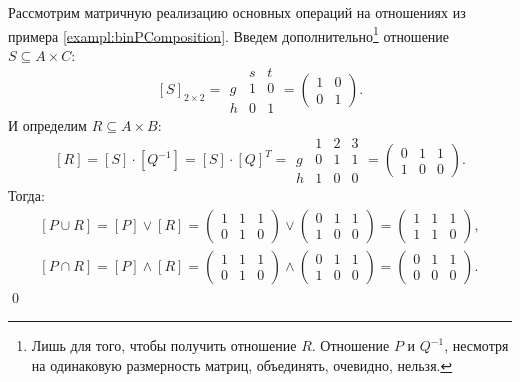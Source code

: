 \begin{exampl}
    Рассмотрим матричную реализацию основных операций на отношениях из примера \ref{exampl:binPComposition}. Введем дополнительно\footnote{Лишь для того, чтобы получить отношение $R$. Отношение $P$ и $Q^{-1}$, несмотря на одинаковую размерность матриц, объединять, очевидно, нельзя.} отношение $S\subseteq A\times C$:
    \[
        [S]_{2\times 2}=
        \begin{array}{c|cc}
              & s & t \\ \hline
            g & 1 & 0 \\
            h & 0 & 1 
        \end{array}=
        \begin{pmatrix}
            1&0\\
            0&1
        \end{pmatrix}.        
    \]
    И определим $R\subseteq A\times B$:
    \[
        [R]=[S]\cdot[Q^{-1}]=
        [S]\cdot[Q]^T=
        \begin{array}{c|ccc}
              & 1 & 2 & 3 \\ \hline
            g & 0 & 1 & 1 \\
            h & 1 & 0 & 0
        \end{array}=
        \begin{pmatrix}
            0 & 1 & 1 \\
            1 & 0 & 0
        \end{pmatrix}.        
    \]
    Тогда:
    \[
    \begin{split}
    [P\cup R]=[P]\lor[R]=
        \begin{pmatrix}1&1&1\\0&1&0\end{pmatrix}\lor
        \begin{pmatrix}0&1&1\\1&0&0\end{pmatrix}=
        \begin{pmatrix}1&1&1\\1&1&0\end{pmatrix},\\
    [P\cap R]=[P]\land[R]=
        \begin{pmatrix}1&1&1\\0&1&0\end{pmatrix}\land
        \begin{pmatrix}0&1&1\\1&0&0\end{pmatrix}=
        \begin{pmatrix}0&1&1\\0&0&0\end{pmatrix}.
    \end{split}    
    \]
    \qed
\end{exampl}



